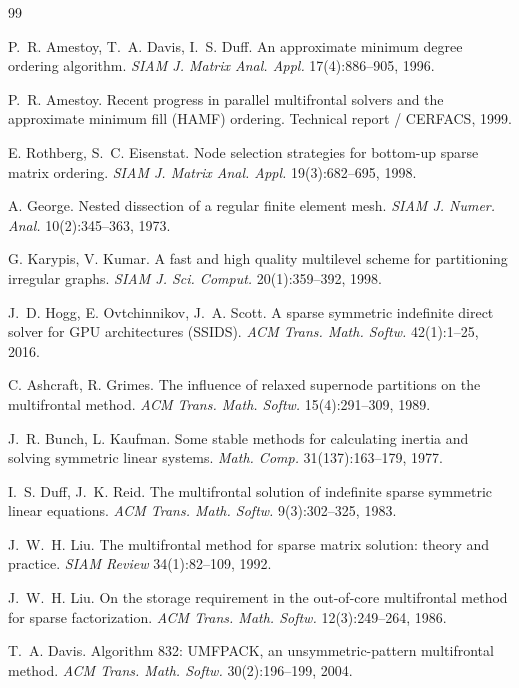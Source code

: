 \documentclass[11pt,a4paper]{article}
\begin{document}
\begingroup
\footnotesize
\setlength{\itemsep}{1pt}
\begin{thebibliography}{99}

 P.~R. Amestoy, T.~A. Davis, I.~S. Duff. An approximate minimum degree
ordering algorithm. \emph{SIAM J. Matrix Anal. Appl.} 17(4):886--905, 1996.

 P.~R. Amestoy. Recent progress in parallel multifrontal solvers and the
approximate minimum fill (HAMF) ordering. Technical report / CERFACS, 1999.

 E. Rothberg, S.~C. Eisenstat. Node selection strategies for
bottom-up sparse matrix ordering. \emph{SIAM J. Matrix Anal. Appl.} 19(3):682--695, 1998.

 A. George. Nested dissection of a regular finite element mesh.
\emph{SIAM J. Numer. Anal.} 10(2):345--363, 1973.

 G. Karypis, V. Kumar. A fast and high quality multilevel scheme for
partitioning irregular graphs. \emph{SIAM J. Sci. Comput.} 20(1):359--392, 1998.

 J.~D. Hogg, E. Ovtchinnikov, J.~A. Scott. A sparse symmetric indefinite
direct solver for GPU architectures (SSIDS). \emph{ACM Trans. Math. Softw.}
42(1):1--25, 2016.

 C. Ashcraft, R. Grimes. The influence of relaxed supernode partitions
on the multifrontal method. \emph{ACM Trans. Math. Softw.} 15(4):291--309, 1989.

 J.~R. Bunch, L. Kaufman. Some stable methods for calculating
inertia and solving symmetric linear systems. \emph{Math. Comp.} 31(137):163--179, 1977.

 I.~S. Duff, J.~K. Reid. The multifrontal solution of indefinite sparse
symmetric linear equations. \emph{ACM Trans. Math. Softw.} 9(3):302--325, 1983.

 J.~W.~H. Liu. The multifrontal method for sparse matrix solution: theory
and practice. \emph{SIAM Review} 34(1):82--109, 1992.

 J.~W.~H. Liu. On the storage requirement in the out-of-core multifrontal
method for sparse factorization. \emph{ACM Trans. Math. Softw.} 12(3):249--264, 1986.

 T.~A. Davis. Algorithm 832: UMFPACK, an unsymmetric-pattern
multifrontal method. \emph{ACM Trans. Math. Softw.} 30(2):196--199, 2004.


\end{thebibliography}
\end{document}
